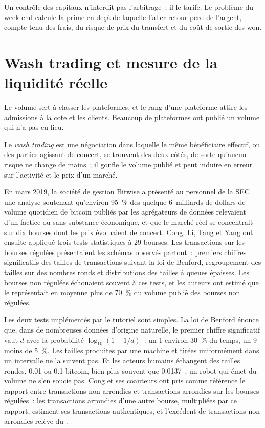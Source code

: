 Un contrôle des capitaux n'interdit pas l'arbitrage~; il le tarife. Le problème du week-end calcule la prime en deçà de
laquelle l'aller-retour perd de l'argent, compte tenu des frais, du risque de prix du transfert et du coût de sortie des won.

\section{Wash trading et mesure de la liquidité réelle}

Le volume sert à classer les plateformes, et le rang d'une plateforme attire les admissions à la cote et les clients. Beaucoup de plateformes ont publié un
volume qui n'a pas eu lieu.

\begin{definition}\label{def:m3:spot-markets:wash}
Le \emph{wash trading} est une négociation dans laquelle le même bénéficiaire effectif, ou des parties agissant de
concert, se trouvent des deux côtés, de sorte qu'aucun risque ne change de mains~; il gonfle le volume publié et peut induire
en erreur sur l'activité et le prix d'un marché.
\end{definition}

En mars 2019, la société de gestion Bitwise a présenté au personnel de la SEC une analyse soutenant qu'environ 95~\% des
quelque 6~milliards de dollars de volume quotidien de bitcoin publiés par les agrégateurs de données relevaient
d'un  factice ou sans substance économique, et que le marché réel se concentrait sur dix bourses dont les prix évoluaient
de concert. Cong, Li, Tang et Yang ont ensuite appliqué trois tests statistiques à 29 bourses. Les transactions sur les bourses
régulées présentaient les schémas observés partout~: premiers chiffres significatifs des tailles de transactions suivant la loi de Benford, regroupement des
tailles sur des nombres ronds et distributions des tailles à queues épaisses. Les bourses non régulées échouaient souvent à ces tests, et les
auteurs ont estimé que le  représentait en moyenne plus de 70~\% du volume publié des bourses non régulées.

Les deux tests implémentés par le tutoriel sont simples. La loi de Benford énonce que, dans de nombreuses données d'origine naturelle, le
premier chiffre significatif vaut $d$ avec la probabilité $\log_{10}(1 + 1/d)$~: un 1 environ 30~\% du temps, un 9 moins de 5~\%.
Les tailles produites par une machine et tirées uniformément dans un intervalle ne la suivent pas. Et les acteurs humains échangent des tailles rondes, 0.01 ou 0.1
bitcoin, bien plus souvent que 0.0137~; un robot qui émet du volume ne s'en soucie pas. Cong et ses coauteurs ont pris comme référence le rapport entre transactions non arrondies et transactions arrondies sur les
bourses régulées~: les transactions arrondies d'une autre bourse, multipliées par ce
rapport, estiment ses transactions authentiques, et l'excédent de transactions non arrondies relève du .

